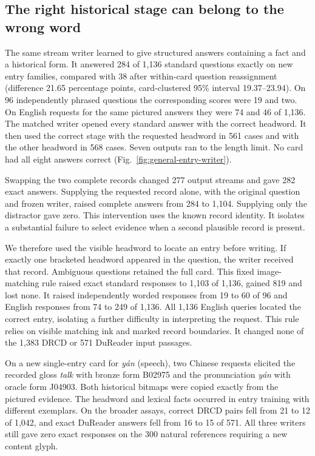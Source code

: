 \subsection*{The right historical stage can belong to the wrong word}
The same stream writer learned to give structured answers containing a fact and a historical form. It answered 284 of 1,136 standard questions exactly on new entry families, compared with 38 after within-card question reassignment (difference 21.65 percentage points, card-clustered 95\% interval 19.37--23.94). On 96 independently phrased questions the corresponding scores were 19 and two. On English requests for the same pictured answers they were 74 and 46 of 1,136. The matched writer opened every standard answer with the correct headword. It then used the correct stage with the requested headword in 561 cases and with the other headword in 568 cases. Seven outputs ran to the length limit. No card had all eight answers correct (Fig.~\ref{fig:general-entry-writer}).

Swapping the two complete records changed 277 output streams and gave 282 exact answers. Supplying the requested record alone, with the original question and frozen writer, raised complete answers from 284 to 1,104. Supplying only the distractor gave zero. This intervention uses the known record identity. It isolates a substantial failure to select evidence when a second plausible record is present.

We therefore used the visible headword to locate an entry before writing. If exactly one bracketed headword appeared in the question, the writer received that record. Ambiguous questions retained the full card. This fixed image-matching rule raised exact standard responses to 1,103 of 1,136, gained 819 and lost none. It raised independently worded responses from 19 to 60 of 96 and English responses from 74 to 249 of 1,136. All 1,136 English queries located the correct entry, isolating a further difficulty in interpreting the request. This rule relies on visible matching ink and marked record boundaries. It changed none of the 1,383 DRCD or 571 DuReader input passages.

On a new single-entry card for \textit{y\'an} (speech), two Chinese requests elicited the recorded gloss \textit{talk} with bronze form B02975 and the pronunciation \textit{y\'an} with oracle form J04903. Both historical bitmaps were copied exactly from the pictured evidence. The headword and lexical facts occurred in entry training with different exemplars. On the broader assays, correct DRCD pairs fell from 21 to 12 of 1,042, and exact DuReader answers fell from 16 to 15 of 571. All three writers still gave zero exact responses on the 300 natural references requiring a new content glyph.
